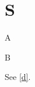 \documentclass{article}
\begin{document}
\section{S}
\begin{thm}A\end{thm}
\begin{defn}\label{d}B\end{defn}
See \ref{d}.
\end{document}
